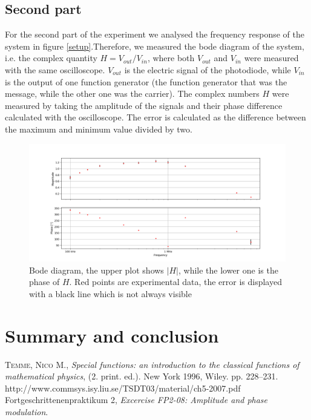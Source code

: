 \documentclass[a4paper,10pt]{article}
\begin{document}
\subsection{Second part}
For the second part of the experiment we analysed the frequency response of the system in figure \ref{setup}.Therefore, we measured the bode diagram of the system, i.e. the complex quantity $H = V_{out}/V_{in}$, where both $V_{out}$ and $V_{in}$ were measured with the same oscilloscope. $V_{out}$ is the electric signal of the photodiode, while $V_{in}$ is the output of one function generator (the function generator that was the message, while the other one was the carrier). The complex numbers $H$ were measured by taking the amplitude of the signals and their phase difference calculated with the oscilloscope. The error is calculated as the difference between the maximum and minimum value divided by two.
\begin{figure}[H]
\centering
\includegraphics[width=\textwidth]{bode}
\caption{Bode diagram, the upper plot shows $|H|$, while the lower one is the phase of $H$. Red points are experimental data, the error is displayed with a black line which is not always visible}\label{bode}
\end{figure}

\section{Summary and conclusion}


\begin{thebibliography}{99}
\textsc{Temme, Nico M.}, \textit{Special functions: an introduction to the classical functions of mathematical physics}, (2. print. ed.). New York 1996, Wiley. pp. 228–231. 
 http://www.commsys.isy.liu.se/TSDT03/material/ch5-2007.pdf
Fortgeschrittenenpraktikum 2, \textit{Excercise FP2-08: Amplitude and phase modulation}.
\end{thebibliography}
\end{document}
